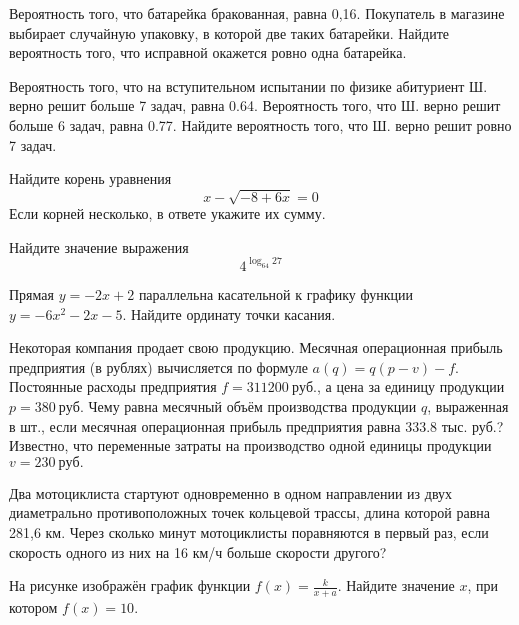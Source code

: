 \begin{taskBN}{3}
Вероятность того, что батарейка бракованная, равна 0,16. Покупатель в магазине выбирает случайную упаковку, в которой две таких батарейки. Найдите вероятность того, что исправной окажется ровно одна батарейка.
\end{taskBN}

\begin{taskBN}{4}
Вероятность того, что на вступительном испытании по физике абитуриент Ш. верно решит больше 7 задач, равна 0.64. Вероятность того, что Ш. верно решит больше 6 задач, равна 0.77. Найдите вероятность того, что Ш. верно решит ровно 7 задач.
\end{taskBN}

\begin{taskBN}{5}
Найдите корень уравнения $$x-\sqrt{-8+6x}=0$$ Если корней несколько, в ответе укажите их сумму.
\end{taskBN}

\begin{taskBN}{6}
Найдите значение выражения $${4}^{\log_{64}{27}}$$
\end{taskBN}

\begin{taskBN}{7}
Прямая $y=-2x+2$ параллельна касательной к графику функции $y=-6x^{2}-2x-5$. Найдите ординату точки касания.
\end{taskBN}

\begin{taskBN}{8}
Некоторая компания продает свою продукцию. Месячная операционная прибыль предприятия (в рублях) вычисляется по формуле $a(q)=q(p-v)-f$. Постоянные расходы предприятия $f=311200~руб.$, а цена за единицу продукции $p=380~руб.$ Чему равна месячный объём производства продукции $q$, выраженная в шт., если месячная операционная прибыль предприятия равна 333.8 тыс. руб.? Известно, что переменные затраты на производство одной единицы продукции $v=230~руб.$ 
\end{taskBN}

\begin{taskBN}{9}
Два мотоциклиста стартуют одновременно в одном направлении из двух диаметрально противоположных точек кольцевой трассы, длина которой равна 281,6 км. Через сколько минут мотоциклисты поравняются в первый раз, если скорость одного из них на 16 км/ч больше скорости другого? 
\end{taskBN}

\begin{taskBN}{10}
На рисунке изображён график функции $f(x)=\frac{k}{x+a}$. Найдите значение $x$, при котором $f(x)=10$.
\end{taskBN}

